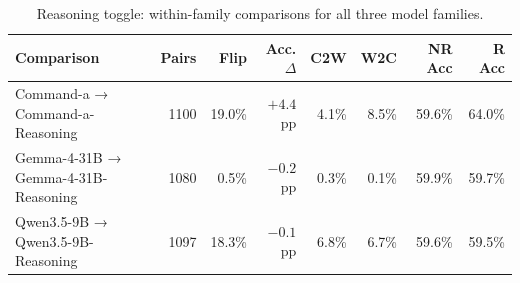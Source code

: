 \begin{table}[t]
\centering\footnotesize
\setlength{\tabcolsep}{4pt}
\begin{tabularx}{\textwidth}{Xrrrrrrr}
\toprule
Comparison & Pairs & Flip & Acc. $\Delta$ & C2W & W2C & NR Acc & R Acc \\
\midrule
Command-a → Command-a-Reasoning & 1100 & 19.0\% & $+4.4$ pp & 4.1\% & 8.5\% & 59.6\% & 64.0\% \\
Gemma-4-31B → Gemma-4-31B-Reasoning & 1080 & 0.5\% & $-0.2$ pp & 0.3\% & 0.1\% & 59.9\% & 59.7\% \\
Qwen3.5-9B → Qwen3.5-9B-Reasoning & 1097 & 18.3\% & $-0.1$ pp & 6.8\% & 6.7\% & 59.6\% & 59.5\% \\
\bottomrule
\end{tabularx}
\caption{Reasoning toggle: within-family comparisons for all three model families.}
\label{tab:reasoning}
\end{table}
